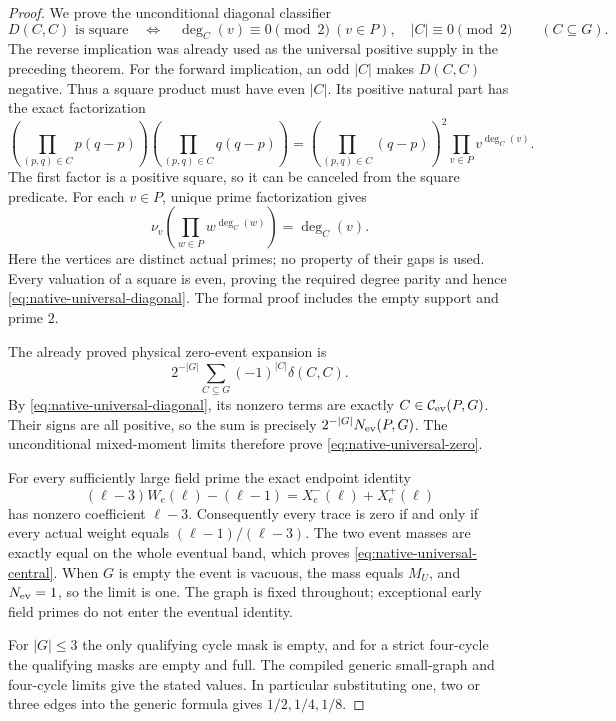 \documentclass[11pt]{article}
\begin{document}
\begin{proof}
We prove the unconditional diagonal classifier
\begin{equation}\label{eq:native-universal-diagonal}
 D(C,C)\text{ is square}
 \quad\Longleftrightarrow\quad
 \deg_C(v)\equiv0\pmod2\ (v\in P),\quad |C|\equiv0\pmod2
 \qquad(C\subseteq G).
\end{equation}
The reverse implication was already used as the universal positive
supply in the preceding theorem.
For the forward implication, an odd \(|C|\) makes \(D(C,C)\) negative.
Thus a square product must have even \(|C|\).
Its positive natural part has the exact factorization
\[
 \left(\prod_{(p,q)\in C}p(q-p)\right)
 \left(\prod_{(p,q)\in C}q(q-p)\right)
 =
 \left(\prod_{(p,q)\in C}(q-p)\right)^2
 \prod_{v\in P}v^{\deg_C(v)}.
\]
The first factor is a positive square, so it can be canceled from the
square predicate. For each \(v\in P\), unique prime factorization gives
\[
 \nu_v\left(\prod_{w\in P}w^{\deg_C(w)}\right)=\deg_C(v).
\]
Here the vertices are distinct actual primes; no property of their
gaps is used. Every valuation of a square is even, proving the required
degree parity and hence \eqref{eq:native-universal-diagonal}.
The formal proof includes the empty support and prime \(2\).

The already proved physical zero-event expansion is
\[
 2^{-|G|}\sum_{C\subseteq G}(-1)^{|C|}\delta(C,C).
\]
By \eqref{eq:native-universal-diagonal}, its nonzero terms are
exactly \(C\in\mathcal C_{\rm ev}(P,G)\).
Their signs are all positive, so the sum is precisely
\(2^{-|G|}N_{\rm ev}(P,G)\).
The unconditional mixed-moment limits therefore prove
\eqref{eq:native-universal-zero}.

For every sufficiently large field prime the exact endpoint identity
\[
 (\ell-3)W_e(\ell)-(\ell-1)=X^-_e(\ell)+X^+_e(\ell)
\]
has nonzero coefficient \(\ell-3\).
Consequently every trace is zero if and only if every actual weight
equals \((\ell-1)/(\ell-3)\).
The two event masses are exactly equal on the whole eventual band,
which proves \eqref{eq:native-universal-central}.
When \(G\) is empty the event is vacuous, the mass equals \(M_U\),
and \(N_{\rm ev}=1\), so the limit is one.
The graph is fixed throughout; exceptional early field primes do not
enter the eventual identity.

For \(|G|\leq3\) the only qualifying cycle mask is empty, and for
a strict four-cycle the qualifying masks are empty and full.
The compiled generic small-graph and four-cycle limits give the stated
values. In particular substituting one, two or three edges into the
generic formula gives \(1/2,1/4,1/8\).
\end{proof}
\end{document}

